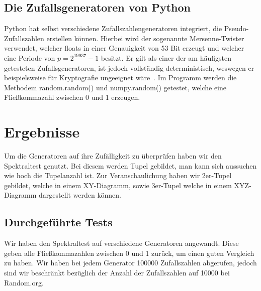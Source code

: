 \documentclass[12pt]{article}
\begin{document}
    \subsection{Die Zufallsgeneratoren von Python}\label{subsec:die-zufallsgeneratoren-von-python}
    Python hat selbst verschiedene Zufallszahlengeneratoren integriert, die Pseudo-Zufallszahlen erstellen können.
    Hierbei wird der sogenannte Mersenne-Twister verwendet, welcher floats in einer Genauigkeit von 53 Bit erzeugt und welcher
    eine Periode von $p=2^{19937}-1$ besitzt.
    Er gilt als einer der am häufigsten getesteten Zufallsgeneratoren, ist jedoch vollständig deterministisch,
    weswegen er beispielsweise für Kryptografie ungeeignet wäre~\cite{python-random,mersenne-twister}.
    Im Programm werden die Methodem random.random() und numpy.random() getestet,
    welche eine Fließkommazahl zwischen 0 und 1 erzeugen.



    \section{Ergebnisse}\label{sec:Ergebnisse}
    Um die Generatoren auf ihre Zufälligkeit zu überprüfen haben wir den Spektraltest genutzt.
    Bei diesem werden Tupel gebildet, man kann sich aussuchen wie hoch die Tupelanzahl ist.
    Zur Veranschaulichung haben wir 2er-Tupel gebildet, welche in einem XY-Diagramm, sowie 3er-Tupel welche in einem
    XYZ-Diagramm dargestellt werden können.

    \subsection{Durchgeführte Tests}\label{subsec:durchgeführte-tests}
    Wir haben den Spektraltest auf verschiedene Generatoren angewandt.
    Diese geben alle Fließkommazahlen zwischen 0 und 1 zurück, um einen guten Vergleich zu haben.
    Wir haben bei jedem Generator 100000 Zufallszahlen abgerufen,
    jedoch sind wir beschränkt bezüglich der Anzahl der Zufallszahlen auf 10000 bei Random.org.
\end{document}
